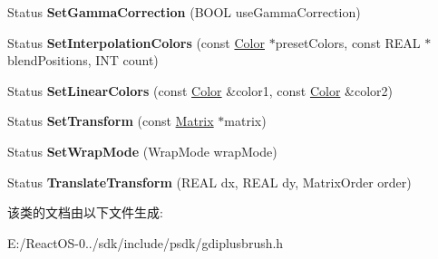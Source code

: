 \begin{DoxyCompactItemize}
\mbox{\label{class_linear_gradient_brush_a8c19643d0f1b33635473f36de0a0b7da}} 
Status {\bfseries Set\+Gamma\+Correction} (B\+O\+OL use\+Gamma\+Correction)
\item 
\mbox{\label{class_linear_gradient_brush_a4da9a3dc332f369eeb2c610ce4e2955b}} 
Status {\bfseries Set\+Interpolation\+Colors} (const \hyperlink{struct_color}{Color} $\ast$preset\+Colors, const R\+E\+AL $\ast$blend\+Positions, I\+NT count)
\item 
\mbox{\label{class_linear_gradient_brush_ad6a428207bf150f8aedd8e54049faa3d}} 
Status {\bfseries Set\+Linear\+Colors} (const \hyperlink{struct_color}{Color} \&color1, const \hyperlink{struct_color}{Color} \&color2)
\item 
\mbox{\label{class_linear_gradient_brush_a1fc4746ae8bba76c6f46526ec65d186b}} 
Status {\bfseries Set\+Transform} (const \hyperlink{class_matrix}{Matrix} $\ast$matrix)
\item 
\mbox{\label{class_linear_gradient_brush_ac13cb113f10cfca40d36392f6ae5097a}} 
Status {\bfseries Set\+Wrap\+Mode} (Wrap\+Mode wrap\+Mode)
\item 
\mbox{\label{class_linear_gradient_brush_ae9d07a94e30c8ddf7fa4e6b2a2b49d7d}} 
Status {\bfseries Translate\+Transform} (R\+E\+AL dx, R\+E\+AL dy, Matrix\+Order order)
\end{DoxyCompactItemize}


该类的文档由以下文件生成\+:\begin{DoxyCompactItemize}
\item 
E\+:/\+React\+O\+S-\/0../sdk/include/psdk/gdiplusbrush.\+h\end{DoxyCompactItemize}
